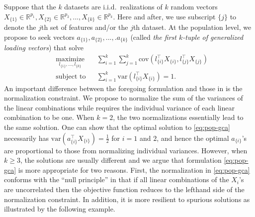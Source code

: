 \documentclass[11pt]{article}
\newcommand{\nb}[1]{\textcolor{orange}{\texttt{[#1]}}}
\newcommand{\gsc}[1]{\textcolor{blue}{\texttt{[#1]}}}
\newcommand{\dc}[1]{\{#1\}} %
\newcommand{\0}{{\mathbf{0}}}
\begin{document}
Suppose that the $k$ datasets are i.i.d.~realizations of 
$k$ random vectors ${ X_{\dc{1}}}\in\mathbb{R}^{p_1}, 
{X_{\dc{2}}}\in\mathbb{R}^{p_2}, ..., {X_{\dc{k}}}\in\mathbb{R}^{p_k}$. 
{Here and after, we use subscript $\{j\}$ to denote the $j$th set of features and/or the $j$th dataset.}
At the population level, 
we propose to seek vectors ${ a_{\dc{1}}},{a_{\dc{2}}},...,.{a_{\dc{k}}}$ 
(called \textit{the first $k$-tuple of generalized loading vectors}) that solve
\begin{equation}
      \label{eq:pop-gca}
\begin{aligned}
& \underset{{l_{\dc{1}}, \dots, l_{\dc{k}}}}{\text{maximize}}
& & \sum_{i=1}^k \sum_{j=1}^k\text{cov}({ l_{\dc{i}}^\top} { X_{\dc{i}}},{ l_{\dc{j}}^\top} {X_{\dc{j}}}) \\
& \text{subject to}
& & \sum_{i=1}^k \text{var}({ l_{\dc{i}}^\top} { X_{\dc{i}}})=1.
\end{aligned}
\end{equation}
An important difference between the foregoing formulation and those in \citet{kettenring1971canonical} is the normalization constraint. 
We propose to normalize the sum of the variances of the linear combinations while \citet{kettenring1971canonical} 
requires
the individual variance of each linear combination to be one.
When $k = 2$, the two normalizations essentially lead to the same solution.
One can show that the optimal solution to \eqref{eq:pop-gca} necessarily has $\text{var}({ a_{\dc{i}}^\top  X_{\dc{i}}}) = \frac{1}{2}$ for $i=1$ and $2$, and hence the optimal ${ a_{\dc{i}}}$'s are proportional to those from normalizing individual variances. 
However, when $k \geq 3$, the solutions are usually different and we argue that 
formulation 
\eqref{eq:pop-gca} is more appropriate for two reasons.
First, the normalization in \eqref{eq:pop-gca} conforms with the ``null principle'' \citep{donnell1994analysis} in that if all linear combinations of the $X_i$'s are uncorrelated then the objective function reduces to the lefthand side of the normalization constraint.
In addition, it is more resilient to spurious solutions as illustrated by the following example. 
\end{document}
